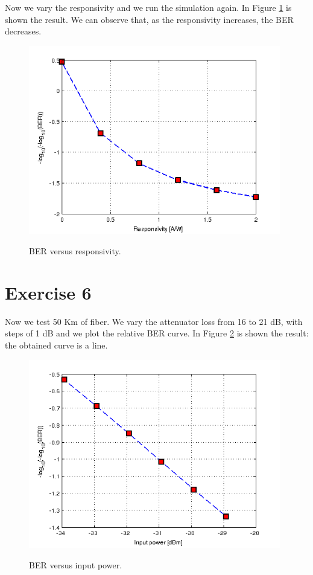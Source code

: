 \documentclass[a4paper,10pt]{report}
\begin{document}
Now we vary the responsivity and we run the simulation again. In Figure \ref{ex5_3} is shown the result.
We can observe that, as the responsivity increases, the BER decreases.

\begin{figure}[!ht]
   \centering
   \includegraphics[width=11cm]{ex5_3.png}\\
   \caption{BER versus responsivity.}
   \label{ex5_3}
\end{figure}



\newpage
\section*{Exercise 6}
Now we test 50 Km of fiber. We vary the attenuator loss from 16 to 21 dB, with steps of 1 dB and we plot the relative BER curve.
In Figure \ref{ex6_1} is shown the result: the obtained curve is a line.

\begin{figure}[!ht]
   \centering
   \includegraphics[width=11cm]{ex6_1.png}\\
   \caption{BER versus input power.}
   \label{ex6_1}
\end{figure}
\end{document}
